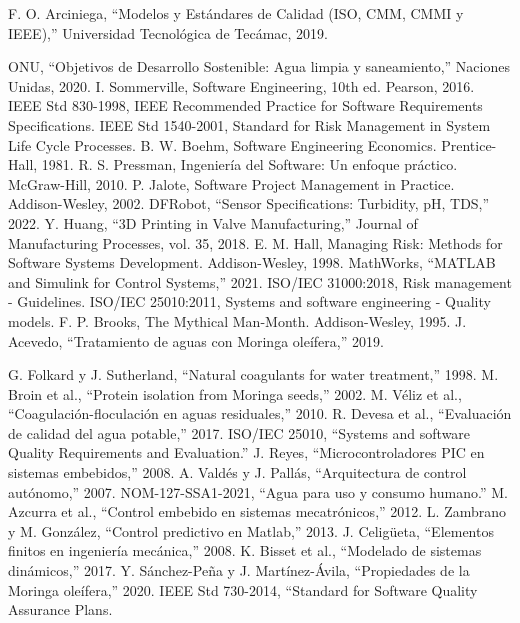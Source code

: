 \documentclass[conference]{IEEEtran}
\begin{document}
\begin{thebibliography}{00}
		 F. O. Arciniega, ``Modelos y Est\'andares de Calidad (ISO, CMM, CMMI y IEEE),'' Universidad Tecnol\'ogica de Tec\'amac, 2019.
		
		 ONU, ``Objetivos de Desarrollo Sostenible: Agua limpia y saneamiento,'' Naciones Unidas, 2020.
		 I. Sommerville, Software Engineering, 10th ed. Pearson, 2016.
		 IEEE Std 830-1998, IEEE Recommended Practice for Software Requirements Specifications.
		 IEEE Std 1540-2001, Standard for Risk Management in System Life Cycle Processes.
		 B. W. Boehm, Software Engineering Economics. Prentice-Hall, 1981.
		 R. S. Pressman, Ingeniería del Software: Un enfoque práctico. McGraw-Hill, 2010.
		 P. Jalote, Software Project Management in Practice. Addison-Wesley, 2002.
		 DFRobot, ``Sensor Specifications: Turbidity, pH, TDS,'' 2022.
		 Y. Huang, ``3D Printing in Valve Manufacturing,'' Journal of Manufacturing Processes, vol. 35, 2018.
		 E. M. Hall, Managing Risk: Methods for Software Systems Development. Addison-Wesley, 1998.
		 MathWorks, ``MATLAB and Simulink for Control Systems,'' 2021.
		 ISO/IEC 31000:2018, Risk management - Guidelines.
		 ISO/IEC 25010:2011, Systems and software engineering - Quality models.
		 F. P. Brooks, The Mythical Man-Month. Addison-Wesley, 1995.
		 J. Acevedo, ``Tratamiento de aguas con Moringa oleífera,'' 2019.
		
		 G. Folkard y J. Sutherland, ``Natural coagulants for water treatment,'' 1998.
		 M. Broin et al., ``Protein isolation from Moringa seeds,'' 2002.
		 M. Véliz et al., ``Coagulación-floculación en aguas residuales,'' 2010.
		 R. Devesa et al., ``Evaluación de calidad del agua potable,'' 2017.
		 ISO/IEC 25010, ``Systems and software Quality Requirements and Evaluation.''
		 J. Reyes, ``Microcontroladores PIC en sistemas embebidos,'' 2008.
		 A. Valdés y J. Pallás, ``Arquitectura de control autónomo,'' 2007.
		 NOM-127-SSA1-2021, ``Agua para uso y consumo humano.''
		 M. Azcurra et al., ``Control embebido en sistemas mecatrónicos,'' 2012.
		 L. Zambrano y M. González, ``Control predictivo en Matlab,'' 2013.
		 J. Celigüeta, ``Elementos finitos en ingeniería mecánica,'' 2008.
		 K. Bisset et al., ``Modelado de sistemas dinámicos,'' 2017.
		 Y. Sánchez-Peña y J. Martínez-Ávila, ``Propiedades de la Moringa oleífera,'' 2020.
		 IEEE Std 730-2014, ``Standard for Software Quality Assurance Plans.

		
	\end{thebibliography}
	
\end{document}
